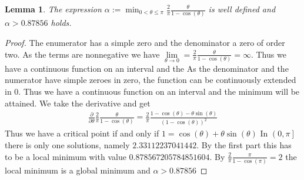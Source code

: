 \documentclass[12pt,a4paper]{article}
\theoremstyle{mythm}
\newtheorem{lem}[thm]{Lemma}
\begin{document}
\begin{lem}
\label{lem:alpha} 
The expression $ \alpha := \min_{0 < \theta \leq \pi   } \frac{ 2 }{ \pi } \frac{ \theta }{ 1- \cos( \theta )  }  $ is well defined and $ \alpha > 0.87856 $ holds.
\end{lem} 
\begin{proof}
The enumerator has a simple zero and the denominator a zero of order two. As the terms are nonnegative we have $ \lim\limits_{\theta  \to 0 } = \frac{ 2 }{ \pi  } \frac{ \theta }{ 1 - \cos( \theta )  }
= \infty $. Thus we have a continuous function on an interval and the
As the denominator and the numerator have simple zeroes in zero, the function can be continuously extended in 0. Thus we have a continuous function on an interval and the
minimum will be attained.
We take the derivative and get
\begin{align*}
\frac{ \partial  }{ \partial \theta } \frac{ 2 }{ \pi  } \frac{ \theta }{ 1 - \cos( \theta )  } = \frac{ 2 }{ \pi } \frac{ 1 - \cos( \theta ) - \theta \sin( \theta )  }{ \left( 1 - \cos( \theta )  \right) ^{ 2 }   } 
\end{align*} 
Thus we have a critical point if and only if $ 1 = \cos( \theta ) + \theta \sin( \theta ) $
In $ \left( 0, \pi  \right]  $ there is only one solutions, namely $ 2.33112237041442 $.
By the first part this has to be a local minimum with value $ 0.878567205784851604 $.
By $ \frac{ 2 }{ \pi  } \frac{ \pi  }{ 1 - \cos( \pi )  } =2 $ the local minimum is a global minimum and $ \alpha > 0.87856 $
\end{proof}
\end{document}
